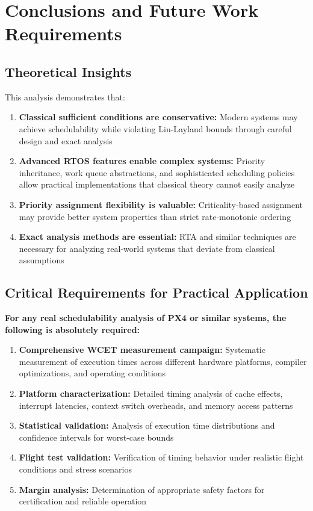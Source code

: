 \documentclass[12pt,a4paper]{article}
\begin{document}
\section{Conclusions and Future Work Requirements}

\subsection{Theoretical Insights}

This analysis demonstrates that:

\begin{enumerate}
\item \textbf{Classical sufficient conditions are conservative:} Modern systems may achieve schedulability while violating Liu-Layland bounds through careful design and exact analysis

\item \textbf{Advanced RTOS features enable complex systems:} Priority inheritance, work queue abstractions, and sophisticated scheduling policies allow practical implementations that classical theory cannot easily analyze

\item \textbf{Priority assignment flexibility is valuable:} Criticality-based assignment may provide better system properties than strict rate-monotonic ordering

\item \textbf{Exact analysis methods are essential:} RTA and similar techniques are necessary for analyzing real-world systems that deviate from classical assumptions
\end{enumerate}

\subsection{Critical Requirements for Practical Application}

\textbf{For any real schedulability analysis of PX4 or similar systems, the following is absolutely required:}

\begin{enumerate}
\item \textbf{Comprehensive WCET measurement campaign:} Systematic measurement of execution times across different hardware platforms, compiler optimizations, and operating conditions

\item \textbf{Platform characterization:} Detailed timing analysis of cache effects, interrupt latencies, context switch overheads, and memory access patterns

\item \textbf{Statistical validation:} Analysis of execution time distributions and confidence intervals for worst-case bounds

\item \textbf{Flight test validation:} Verification of timing behavior under realistic flight conditions and stress scenarios

\item \textbf{Margin analysis:} Determination of appropriate safety factors for certification and reliable operation
\end{enumerate}
\end{document}
